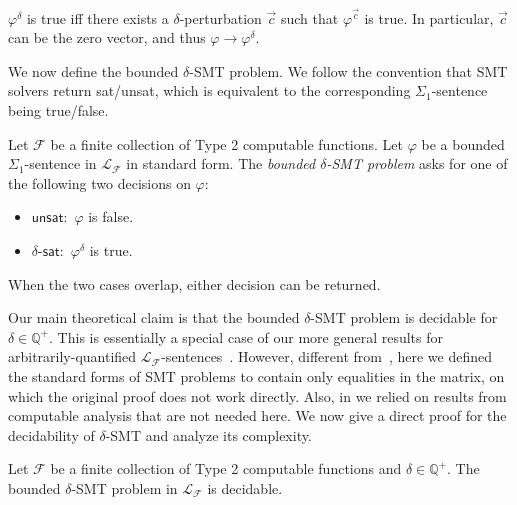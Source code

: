 \documentclass[prodmode]{acmsmall} %
\begin{document}
\begin{proposition} 
$\varphi^{\delta}$ is true iff there exists a $\delta$-perturbation $\vec c$ such that $\varphi^{\vec c}$ is true. In particular, $\vec c$ can be the zero vector, and thus $\varphi\rightarrow\varphi^{\delta}$. 
\end{proposition}

We now define the bounded $\delta$-SMT problem. We follow the convention that SMT solvers return sat/unsat, which is equivalent to the corresponding $\Sigma_1$-sentence being true/false. 


\begin{definition} Let $\mathcal{F}$ be a finite collection of Type 2 computable functions. Let $\varphi$ be a bounded $\Sigma_1$-sentence in $\mathcal{L}_{\mathcal{F}}$ in standard form. The {\em bounded $\delta$-SMT problem} asks for one of the following two decisions on $\varphi$:
\begin{itemize}
\item $\mathsf{unsat}:$ $\varphi$ is false.
\item $\delta$-$\mathsf{sat}:$ $\varphi^{\delta}$ is true. 
\end{itemize}
When the two cases overlap, either decision can be returned. 
\end{definition}

Our main theoretical claim is that the bounded $\delta$-SMT problem is decidable for $\delta\in \mathbb{Q}^+$. This is essentially a special case of our more general results for arbitrarily-quantified $\mathcal{L}_{\mathcal{F}}$-sentences~\cite{gaoextended2}. However, different from~\cite{gaoextended2}, here we defined the standard forms of SMT problems to contain only equalities in the matrix, on which the original proof does not work directly. Also, in \cite{gaoextended2} we relied on results from computable analysis that are not needed here. We now give a direct proof for the decidability of $\delta$-SMT and analyze its complexity. 

\begin{theorem}[Decidability] Let $\mathcal{F}$ be a finite collection of Type 2 computable functions and $\delta\in \mathbb{Q}^+$. The bounded $\delta$-SMT problem in $\mathcal{L}_{\mathcal{F}}$ is decidable.  
\end{theorem}
\end{document}
